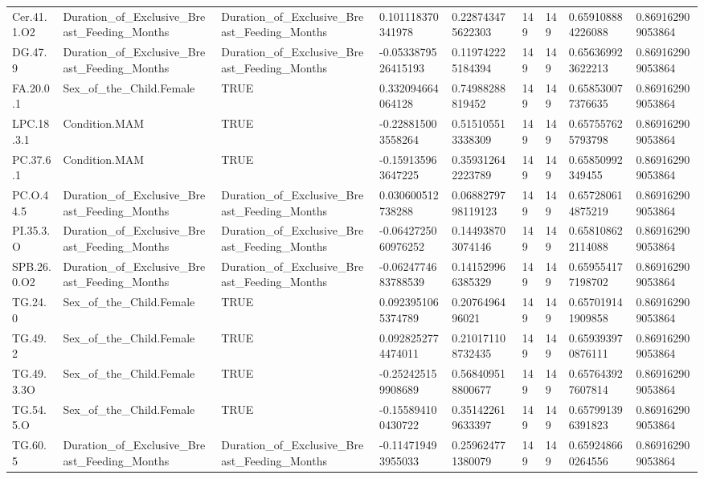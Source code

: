 \begin{longtable}{lllllllll}
Cer.41.1.O2 & Duration\_of\_Exclusive\_Breast\_Feeding\_Months & Duration\_of\_Exclusive\_Breast\_Feeding\_Months & 0.101118370341978 & 0.228743475622303 & 149 & 149 & 0.659108884226088 & 0.869162909053864 \\
DG.47.9 & Duration\_of\_Exclusive\_Breast\_Feeding\_Months & Duration\_of\_Exclusive\_Breast\_Feeding\_Months & -0.0533879526415193 & 0.119742225184394 & 149 & 149 & 0.656369923622213 & 0.869162909053864 \\
FA.20.0.1 & Sex\_of\_the\_Child.Female & TRUE & 0.332094664064128 & 0.74988288819452 & 149 & 149 & 0.658530077376635 & 0.869162909053864 \\
LPC.18.3.1 & Condition.MAM & TRUE & -0.228815003558264 & 0.515105513338309 & 149 & 149 & 0.657557625793798 & 0.869162909053864 \\
PC.37.6.1 & Condition.MAM & TRUE & -0.159135963647225 & 0.359312642223789 & 149 & 149 & 0.65850992349455 & 0.869162909053864 \\
PC.O.44.5 & Duration\_of\_Exclusive\_Breast\_Feeding\_Months & Duration\_of\_Exclusive\_Breast\_Feeding\_Months & 0.030600512738288 & 0.0688279798119123 & 149 & 149 & 0.657280614875219 & 0.869162909053864 \\
PI.35.3.O & Duration\_of\_Exclusive\_Breast\_Feeding\_Months & Duration\_of\_Exclusive\_Breast\_Feeding\_Months & -0.0642725060976252 & 0.144938703074146 & 149 & 149 & 0.658108622114088 & 0.869162909053864 \\
SPB.26.0.O2 & Duration\_of\_Exclusive\_Breast\_Feeding\_Months & Duration\_of\_Exclusive\_Breast\_Feeding\_Months & -0.0624774683788539 & 0.141529966385329 & 149 & 149 & 0.659554177198702 & 0.869162909053864 \\
TG.24.0 & Sex\_of\_the\_Child.Female & TRUE & 0.0923951065374789 & 0.2076496496021 & 149 & 149 & 0.657019141909858 & 0.869162909053864 \\
TG.49.2 & Sex\_of\_the\_Child.Female & TRUE & 0.0928252774474011 & 0.210171108732435 & 149 & 149 & 0.659393970876111 & 0.869162909053864 \\
TG.49.3.3O & Sex\_of\_the\_Child.Female & TRUE & -0.252425159908689 & 0.568409518800677 & 149 & 149 & 0.657643927607814 & 0.869162909053864 \\
TG.54.5.O & Sex\_of\_the\_Child.Female & TRUE & -0.155894100430722 & 0.351422619633397 & 149 & 149 & 0.657991396391823 & 0.869162909053864 \\
TG.60.5 & Duration\_of\_Exclusive\_Breast\_Feeding\_Months & Duration\_of\_Exclusive\_Breast\_Feeding\_Months & -0.114719493955033 & 0.259624771380079 & 149 & 149 & 0.659248660264556 & 0.869162909053864 \\

\end{longtable}
